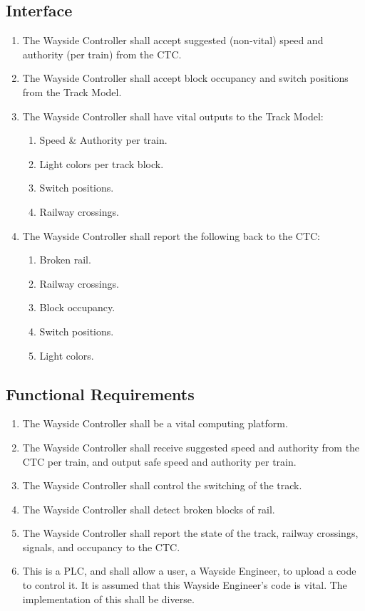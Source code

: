\documentclass{scrreprt}
\begin{document}
\subsection{Interface}
\begin{enumerate}
    \item The Wayside Controller shall accept suggested (non-vital) speed and authority (per train) from the CTC.
    \item The Wayside Controller shall accept block occupancy and switch positions from the Track Model.
    \item The Wayside Controller shall have vital outputs to the Track Model:
    \begin{enumerate}
        \item Speed \& Authority per train.
        \item Light colors per track block.
        \item Switch positions.
        \item Railway crossings.
    \end{enumerate}
    \item The Wayside Controller shall report the following back to the CTC:
    \begin{enumerate}
        \item Broken rail.
        \item Railway crossings.
        \item Block occupancy.
        \item Switch positions.
        \item Light colors.
    \end{enumerate}
\end{enumerate}

\subsection{Functional Requirements}
\begin{enumerate}
    \item The Wayside Controller shall be a vital computing platform.
    \item The Wayside Controller shall receive suggested speed and authority from the CTC per train, and output safe speed and authority per train.
    \item The Wayside Controller shall control the switching of the track.
    \item The Wayside Controller shall detect broken blocks of rail.
    \item The Wayside Controller shall report the state of the track, railway crossings, signals, and occupancy to the CTC.
    \item This is a PLC, and shall allow a user, a Wayside Engineer, to upload a code to control it. It is assumed that this Wayside Engineer's code is vital. The implementation of this shall be diverse.
\end{enumerate}
\end{document}
